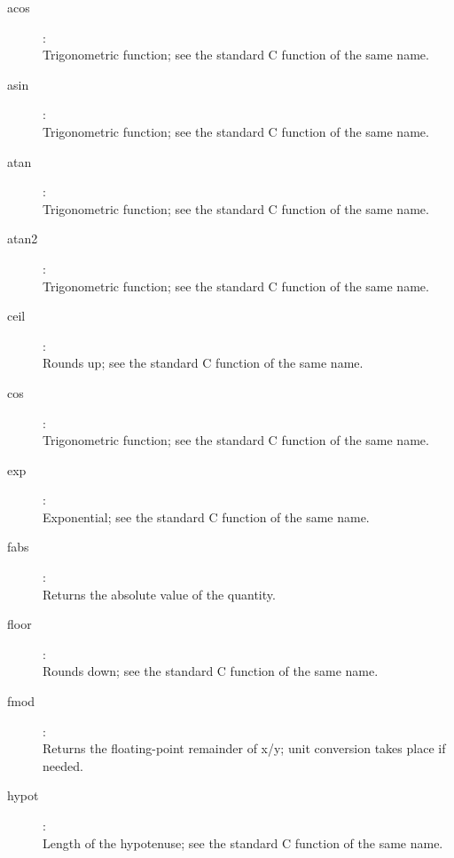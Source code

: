 \begin{description}
\item[acos]:  \\
    Trigonometric function; see the standard C function of the same name.

\item[asin]:  \\
    Trigonometric function; see the standard C function of the same name.

\item[atan]:  \\
    Trigonometric function; see the standard C function of the same name.

\item[atan2]:  \\
    Trigonometric function; see the standard C function of the same name.

\item[ceil]:  \\
    Rounds up; see the standard C function of the same name.

\item[cos]:  \\
    Trigonometric function; see the standard C function of the same name.

\item[exp]:  \\
    Exponential; see the standard C function of the same name.

\item[fabs]:  \\
    Returns the absolute value of the quantity.

\item[floor]:  \\
    Rounds down; see the standard C function of the same name.

\item[fmod]:  \\
    Returns the floating-point remainder of x/y; unit conversion takes place if
    needed.

\item[hypot]:  \\
    Length of the hypotenuse; see the standard C function of the same name.


\end{description}
